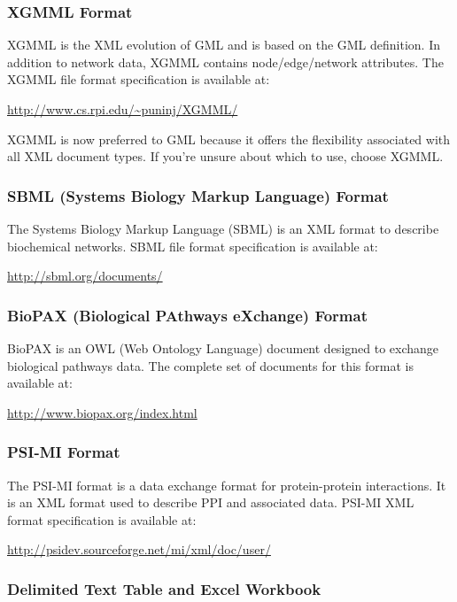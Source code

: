 \subsubsection{XGMML Format}


 XGMML is the XML evolution of GML and is based on the GML definition. In addition to network data, XGMML contains node/edge/network attributes. The XGMML file format specification is available at: 


 \url{http://www.cs.rpi.edu/~puninj/XGMML/}


 XGMML is now preferred to GML because it offers the flexibility associated with all XML document types. If you're unsure about which to use, choose XGMML. 


 
\subsubsection*{SBML (Systems Biology Markup Language) Format}


 The Systems Biology Markup Language (SBML) is an XML format to describe biochemical networks. SBML file format specification is available at: 


 \url{http://sbml.org/documents/}


 
\subsubsection*{BioPAX (Biological PAthways eXchange) Format}


 BioPAX is an OWL (Web Ontology Language) document designed to exchange biological pathways data. The complete set of documents for this format is available at: 


 \url{http://www.biopax.org/index.html}


 
\subsubsection*{PSI-MI Format}


 The PSI-MI format is a data exchange format for protein-protein interactions. It is an XML format used to describe PPI and associated data. PSI-MI XML format specification is available at: 


 \url{http://psidev.sourceforge.net/mi/xml/doc/user/}


 
\subsubsection*{Delimited Text Table and Excel Workbook}


